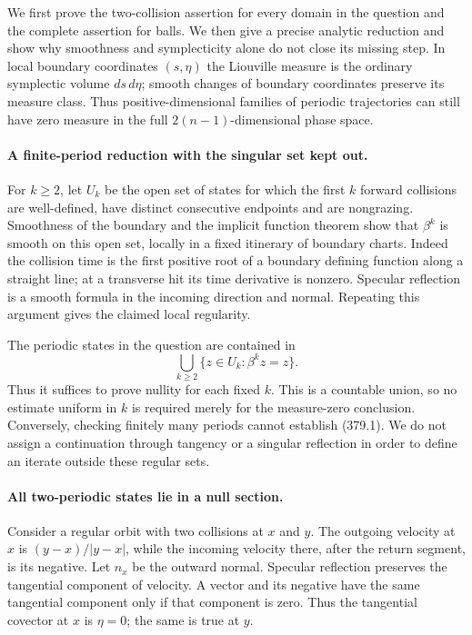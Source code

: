 \documentclass[11pt]{article}
\begin{document}
We first prove the two-collision assertion for every domain in the
question and the complete assertion for balls. We then give a precise
analytic reduction and show why smoothness and symplecticity alone
do not close its missing step. In local boundary coordinates
$(s,\eta)$ the Liouville measure is the ordinary symplectic volume
$ds\,d\eta$; smooth changes of boundary coordinates preserve its
measure class. Thus positive-dimensional families of periodic
trajectories can still have zero measure in the full
$2(n-1)$-dimensional phase space.

\paragraph{A finite-period reduction with the singular set kept out.}
For $k\geq2$, let $U_k$ be the open set of states for which the
first $k$ forward collisions are well-defined, have distinct
consecutive endpoints and are nongrazing. Smoothness of the boundary
and the implicit function theorem show that $\beta^k$ is smooth on
this open set, locally in a fixed itinerary of boundary charts.
Indeed the collision time is the first positive root of a boundary
defining function along a straight line; at a transverse hit its
time derivative is nonzero. Specular reflection is a smooth formula
in the incoming direction and normal. Repeating this argument gives
the claimed local regularity.

The periodic states in the question are contained in
\[
 \bigcup_{k\geq2}\{z\in U_k:\beta^kz=z\}.
 \tag{379.1}
\]
Thus it suffices to prove nullity for each fixed $k$. This is a
countable union, so no estimate uniform in $k$ is required merely
for the measure-zero conclusion. Conversely, checking finitely many
periods cannot establish (379.1). We do not assign a continuation
through tangency or a singular reflection in order to define an
iterate outside these regular sets.

\paragraph{All two-periodic states lie in a null section.}
Consider a regular orbit with two collisions at $x$ and $y$. The
outgoing velocity at $x$ is $(y-x)/|y-x|$, while the incoming
velocity there, after the return segment, is its negative. Let
$n_x$ be the outward normal. Specular reflection preserves the
tangential component of velocity. A vector and its negative have
the same tangential component only if that component is zero.
Thus the tangential covector at $x$ is $\eta=0$; the same is true
at $y$.
\end{document}
